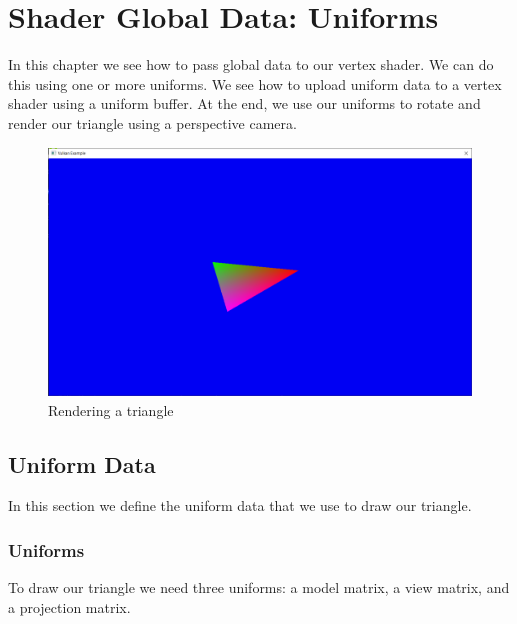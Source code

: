 \chapter{Shader Global Data: Uniforms}

In this chapter we see how to pass global data to our vertex shader.
We can do this using one or more uniforms.
We see how to upload uniform data to a vertex shader using a
uniform buffer.
At the end, we use our uniforms to rotate and render our triangle using
a perspective camera.

\begin{figure}[ht]
    \centering
    \includegraphics[scale=0.20]{images/ChUniforms/RenderTriangle.png}
    \caption{Rendering a triangle}
    \label{fig::RenderTriangleUniforms}
\end{figure}

\section{Uniform Data}

In this section we define the uniform data that we use to draw our triangle.

\subsection{Uniforms}

To draw our triangle we need three uniforms:
a model matrix,
a view matrix,
and a projection matrix.

\begin{minipage}{\linewidth}{\noindent}
    
\end{minipage}

